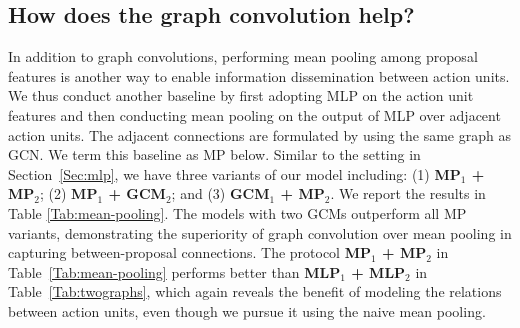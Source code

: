 \documentclass[10pt,journal,compsoc]{IEEEtran}
\begin{document}
	
	\subsection{How does the graph convolution help?}
	In addition to graph convolutions, performing mean pooling among proposal features is another way to enable information dissemination between action units. We thus conduct another baseline by first adopting MLP on the action unit  features and then conducting mean pooling on the output of MLP over adjacent action units. The adjacent connections are formulated by using the same graph as GCN. We term this baseline as MP below.
	Similar to the setting in Section~\ref{Sec:mlp}, we have three variants of our model including: (1) \textbf{MP$_1$ + MP$_2$}; (2) \textbf{MP$_1$ + GCM$_2$}; and (3) \textbf{GCM$_1$ + MP$_2$}. We report the results in Table \ref{Tab:mean-pooling}. The models with two GCMs outperform all MP variants, demonstrating the superiority of graph convolution over mean pooling in capturing between-proposal connections.
	The protocol \textbf{MP$_1$ + MP$_2$} in Table~\ref{Tab:mean-pooling} performs better than \textbf{MLP$_1$ + MLP$_2$} in Table~\ref{Tab:twographs}, which again reveals the benefit of modeling the  relations between action units, even though we pursue it using the naive mean pooling.
	
\end{document}

